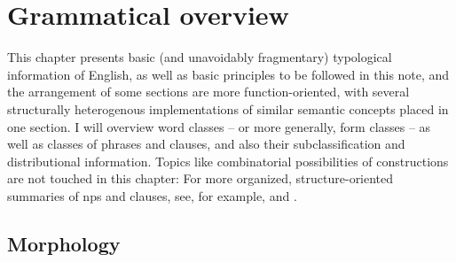 \documentclass[UTF8, a4paper, oneside, scheme=plain]{ctexrep}
\begin{document}
\chapter{Grammatical overview}

This chapter presents basic (and unavoidably fragmentary) typological information of English,
as well as basic principles to be followed in this note,
and the arrangement of some sections are more function-oriented, 
with several structurally heterogenous implementations of 
similar semantic concepts placed in one section.
I will overview word classes -- or more generally, form classes -- 
as well as classes of phrases and clauses,
and also their subclassification and distributional information.
Topics like combinatorial possibilities of constructions
are not touched in this chapter:
For more organized, structure-oriented summaries of 
\acs{np}s and clauses, 
see, for example,  and .


\section{Morphology}
\end{document}
